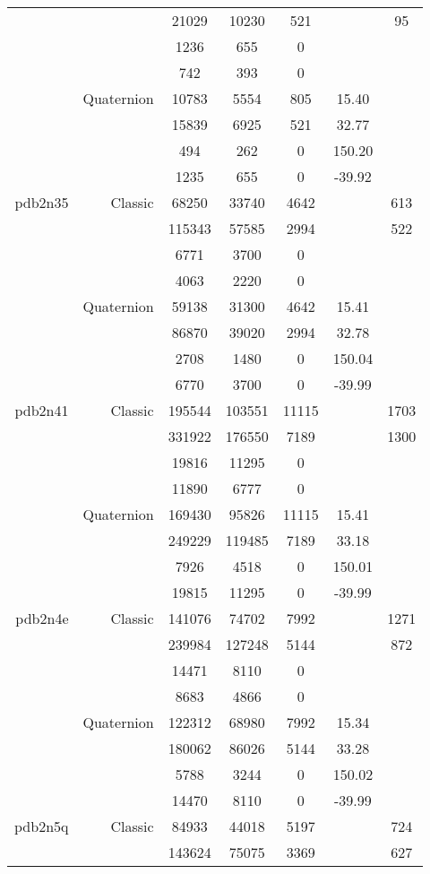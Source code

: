 \begin{xltabular}{\textwidth}{r|rcccSc}
& & 21029 & 10230 & 521 & & 95 \\
& & 1236 & 655 & 0 & & \\
& & 742 & 393 & 0 & & \\
& Quaternion & 10783 & 5554 & 805 & 15.40 & \\
& & 15839 & 6925 & 521 & 32.77 & \\
& & 494 & 262 & 0 & 150.20 & \\
& & 1235 & 655 & 0 & -39.92 & \\ \addlinespace
pdb2n35 & Classic & 68250 & 33740 & 4642 & & 613 \\
& & 115343 & 57585 & 2994 & & 522 \\
& & 6771 & 3700 & 0 & & \\
& & 4063 & 2220 & 0 & & \\
& Quaternion & 59138 & 31300 & 4642 & 15.41 & \\
& & 86870 & 39020 & 2994 & 32.78 & \\
& & 2708 & 1480 & 0 & 150.04 & \\
& & 6770 & 3700 & 0 & -39.99 & \\ \addlinespace
pdb2n41 & Classic & 195544 & 103551 & 11115 & & 1703 \\
& & 331922 & 176550 & 7189 & & 1300 \\
& & 19816 & 11295 & 0 & & \\
& & 11890 & 6777 & 0 & & \\
& Quaternion & 169430 & 95826 & 11115 & 15.41 & \\
& & 249229 & 119485 & 7189 & 33.18 & \\
& & 7926 & 4518 & 0 & 150.01 & \\
& & 19815 & 11295 & 0 & -39.99 & \\ \addlinespace
pdb2n4e & Classic & 141076 & 74702 & 7992 & & 1271 \\
& & 239984 & 127248 & 5144 & & 872 \\
& & 14471 & 8110 & 0 & & \\
& & 8683 & 4866 & 0 & & \\
& Quaternion & 122312 & 68980 & 7992 & 15.34 & \\
& & 180062 & 86026 & 5144 & 33.28 & \\
& & 5788 & 3244 & 0 & 150.02 & \\
& & 14470 & 8110 & 0 & -39.99 & \\ \addlinespace
pdb2n5q & Classic & 84933 & 44018 & 5197 & & 724 \\
& & 143624 & 75075 & 3369 & & 627 \\

\end{xltabular}

